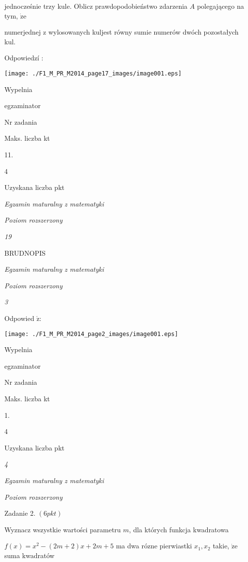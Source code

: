 \documentclass[a4paper,12pt]{article}
\begin{document}
jednocześnie trzy kule. Oblicz prawdopodobieństwo zdarzenia $A$ polegającego na tym, $\dot{\mathrm{z}}\mathrm{e}$

numerjednej z wylosowanych kuljest równy sumie numerów dwóch pozostałych kul.

Odpowiedzí :
\begin{center}
\texttt{[image: ./F1\_M\_PR\_M2014\_page17\_images/image001.eps]}
\end{center}
Wypelnia

egzaminator

Nr zadania

Maks. liczba kt

11.

4

Uzyskana liczba pkt





{\it Egzamin maturalny z matematyki}

{\it Poziom rozszerzony}

{\it 19}

BRUDNOPIS





{\it Egzamin maturalny z matematyki}

{\it Poziom rozszerzony}

{\it 3}

Odpowied $\acute{\mathrm{z}}$:
\begin{center}
\texttt{[image: ./F1\_M\_PR\_M2014\_page2\_images/image001.eps]}
\end{center}
Wypelnia

egzaminator

Nr zadania

Maks. liczba kt

1.

4

Uzyskana liczba pkt





{\it 4}

{\it Egzamin maturalny z matematyki}

{\it Poziom rozszerzony}

Zadanie 2. $(6pkt)$

Wyznacz wszystkie wartości parametru $m$, dla których funkcja kwadratowa

$f(x)=x^{2}-(2m+2)x+2m+5$ ma dwa rózne pierwiastki $x_{1}, x_{2}$ takie, $\dot{\mathrm{z}}\mathrm{e}$ suma kwadratów
\end{document}
